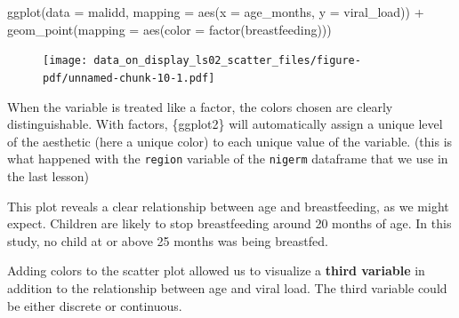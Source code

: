 \documentclass[
  letterpaper,
  DIV=11,
  numbers=noendperiod]{scrreprt}
\newenvironment{Shaded}{\begin{snugshade}}{\end{snugshade}}
\newcommand{\AttributeTok}[1]{\textcolor[rgb]{0.40,0.45,0.13}{#1}}
\newcommand{\FunctionTok}[1]{\textcolor[rgb]{0.28,0.35,0.67}{#1}}
\newcommand{\NormalTok}[1]{\textcolor[rgb]{0.00,0.23,0.31}{#1}}
\newcommand{\SpecialCharTok}[1]{\textcolor[rgb]{0.37,0.37,0.37}{#1}}
\begin{document}
\begin{Shaded}
\begin{Highlighting}[]
\FunctionTok{ggplot}\NormalTok{(}\AttributeTok{data =}\NormalTok{ malidd, }
       \AttributeTok{mapping =} \FunctionTok{aes}\NormalTok{(}\AttributeTok{x =}\NormalTok{ age\_months, }
                     \AttributeTok{y =}\NormalTok{ viral\_load)) }\SpecialCharTok{+} 
  \FunctionTok{geom\_point}\NormalTok{(}\AttributeTok{mapping =} \FunctionTok{aes}\NormalTok{(}\AttributeTok{color =} \FunctionTok{factor}\NormalTok{(breastfeeding)))}
\end{Highlighting}
\end{Shaded}

\begin{figure}[H]

{\centering \texttt{[image: data\_on\_display\_ls02\_scatter\_files/figure-pdf/unnamed-chunk-10-1.pdf]}

}

\end{figure}

When the variable is treated like a factor, the colors chosen are
clearly distinguishable. With factors, \{ggplot2\} will automatically
assign a unique level of the aesthetic (here a unique color) to each
unique value of the variable. (this is what happened with the
\texttt{region} variable of the \texttt{nigerm} dataframe that we use in
the last lesson)

This plot reveals a clear relationship between age and breastfeeding, as
we might expect. Children are likely to stop breastfeeding around 20
months of age. In this study, no child at or above 25 months was being
breastfed.

Adding colors to the scatter plot allowed us to visualize a
\textbf{third variable} in addition to the relationship between age and
viral load. The third variable could be either discrete or continuous.
\end{document}
